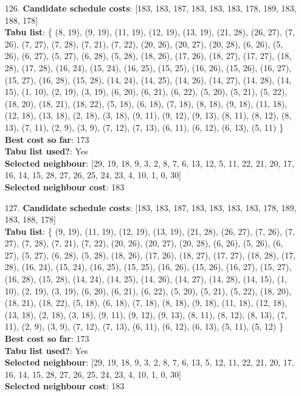 \documentclass[fleqn]{article}
\begin{document}
\begin{itemize}
    \item[126.] \textbf{Candidate schedule costs}: [183, 183, 187, 183, 183, 183, 178, 189, 183, 188, 178] \\
    \textbf{Tabu list}: \{ (8, 19), (9, 19), (11, 19), (12, 19), (13, 19), (21, 28), (26, 27), (7, 26), (7, 27), (7, 28), (7, 21), (7, 22), (20, 26), (20, 27), (20, 28), (6, 26), (5, 26), (6, 27), (5, 27), (6, 28), (5, 28), (18, 26), (17, 26), (18, 27), (17, 27), (18, 28), (17, 28), (16, 24), (15, 24), (16, 25), (15, 25), (16, 26), (15, 26), (16, 27), (15, 27), (16, 28), (15, 28), (14, 24), (14, 25), (14, 26), (14, 27), (14, 28), (14, 15), (1, 10), (2, 19), (3, 19), (6, 20), (6, 21), (6, 22), (5, 20), (5, 21), (5, 22), (18, 20), (18, 21), (18, 22), (5, 18), (6, 18), (7, 18), (8, 18), (9, 18), (11, 18), (12, 18), (13, 18), (2, 18), (3, 18), (9, 11), (9, 12), (9, 13), (8, 11), (8, 12), (8, 13), (7, 11), (2, 9), (3, 9), (7, 12), (7, 13), (6, 11), (6, 12), (6, 13), (5, 11) \} \\
    \textbf{Best cost so far}: 173 \\
    \textbf{Tabu list used?}: Yes \\
    \textbf{Selected neighbour}: [29, 19, 18, 9, 3, 2, 8, 7, 6, 13, 12, 5, 11, 22, 21, 20, 17, 16, 14, 15, 28, 27, 26, 25, 24, 23, 4, 10, 1, 0, 30] \\
    \textbf{Selected neighbour cost}: 183
      

    \item[127.] \textbf{Candidate schedule costs}: [183, 183, 187, 183, 183, 183, 183, 178, 189, 183, 188, 178] \\
    \textbf{Tabu list}: \{ (9, 19), (11, 19), (12, 19), (13, 19), (21, 28), (26, 27), (7, 26), (7, 27), (7, 28), (7, 21), (7, 22), (20, 26), (20, 27), (20, 28), (6, 26), (5, 26), (6, 27), (5, 27), (6, 28), (5, 28), (18, 26), (17, 26), (18, 27), (17, 27), (18, 28), (17, 28), (16, 24), (15, 24), (16, 25), (15, 25), (16, 26), (15, 26), (16, 27), (15, 27), (16, 28), (15, 28), (14, 24), (14, 25), (14, 26), (14, 27), (14, 28), (14, 15), (1, 10), (2, 19), (3, 19), (6, 20), (6, 21), (6, 22), (5, 20), (5, 21), (5, 22), (18, 20), (18, 21), (18, 22), (5, 18), (6, 18), (7, 18), (8, 18), (9, 18), (11, 18), (12, 18), (13, 18), (2, 18), (3, 18), (9, 11), (9, 12), (9, 13), (8, 11), (8, 12), (8, 13), (7, 11), (2, 9), (3, 9), (7, 12), (7, 13), (6, 11), (6, 12), (6, 13), (5, 11), (5, 12) \} \\
    \textbf{Best cost so far}: 173 \\
    \textbf{Tabu list used?}: Yes \\
    \textbf{Selected neighbour}: [29, 19, 18, 9, 3, 2, 8, 7, 6, 13, 5, 12, 11, 22, 21, 20, 17, 16, 14, 15, 28, 27, 26, 25, 24, 23, 4, 10, 1, 0, 30] \\
    \textbf{Selected neighbour cost}: 183
      


\end{itemize}
\end{document}
